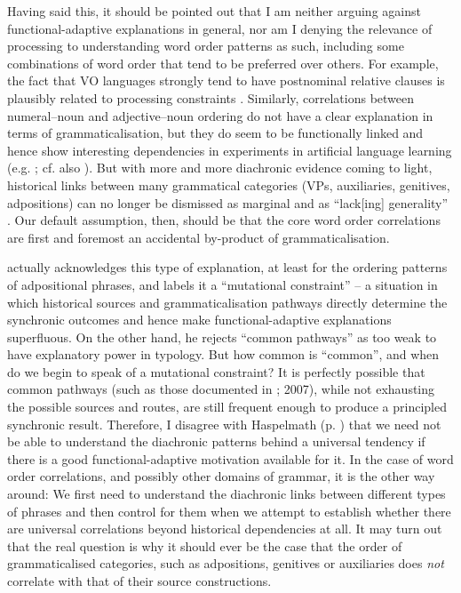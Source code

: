 \documentclass[output=paper]{langsci/langscibook}
\begin{document}
Having said this, it should be pointed out that I am neither arguing against functional-adaptive explanations in general, nor am I denying the relevance of processing to understanding word order patterns as such, including some combinations of word order that tend to be preferred over others. For example, the fact that VO languages strongly tend to have postnominal relative clauses is plausibly related to processing constraints \citep{Hawkins2004}. Similarly, correlations between numeral–noun and adjective–noun ordering do not have a clear explanation in terms of grammaticalisation, but they do seem to be functionally linked and hence show interesting dependencies in experiments in artificial language learning (e.g. \citealt{CulbertsonEtAl2012}; cf. also ). But with more and more diachronic evidence coming to light, historical links between many grammatical categories (VPs, auxiliaries, genitives, adpositions) can no longer be dismissed as marginal and as “lack[ing] generality” \citep[131]{Hawkins1983}. Our default assumption, then, should be that the core word order correlations are first and foremost an accidental by-product of grammaticalisation. 

 actually acknowledges this type of explanation, at least for the ordering patterns of adpositional phrases, and labels it a “mutational constraint” – a situation in which historical sources and grammaticalisation pathways directly determine the synchronic outcomes and hence make functional-adaptive explanations superfluous. On the other hand, he rejects “common pathways” as too weak to have explanatory power in typology. But how common is “common”, and when do we begin to speak of a mutational constraint? It is perfectly possible that common pathways (such as those documented in \citealt{HeineKuteva2002}; 2007), while not exhausting the possible sources and routes, are still frequent enough to produce a principled synchronic result. Therefore, I disagree with Haspelmath (p. \pageref{Haspelmathchapterpageref}) that we need not be able to understand the diachronic patterns behind a universal tendency if there is a good functional-adaptive motivation available for it. In the case of word order correlations, and possibly other domains of grammar, it is the other way around: We first need to understand the diachronic links between different types of phrases and then control for them when we attempt to establish whether there are universal correlations beyond historical dependencies at all. It may turn out that the real question is why it should ever be the case that the order of grammaticalised categories, such as adpositions, genitives or auxiliaries does \textit{not} correlate with that of their source constructions.
\end{document}
